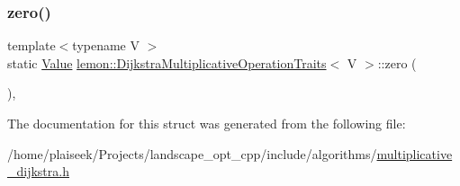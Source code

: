 \mbox{\label{structlemon_1_1_dijkstra_multiplicative_operation_traits_a42a0a16398e1548efd8ffb3616b13866}} 
\subsubsection{\texorpdfstring{zero()}{zero()}}
{\footnotesize\ttfamily template$<$typename V $>$ \\
static \hyperlink{structlemon_1_1_dijkstra_multiplicative_operation_traits_a8832632b11125d59eedb238160bc1554}{Value} \hyperlink{structlemon_1_1_dijkstra_multiplicative_operation_traits}{lemon\+::\+Dijkstra\+Multiplicative\+Operation\+Traits}$<$ V $>$\+::zero (\begin{DoxyParamCaption}{ }\end{DoxyParamCaption})\hspace{0.3cm}{\ttfamily [inline]}, {\ttfamily [static]}}



The documentation for this struct was generated from the following file\+:\begin{DoxyCompactItemize}
\item 
/home/plaiseek/\+Projects/landscape\+\_\+opt\+\_\+cpp/include/algorithms/\hyperlink{multiplicative__dijkstra_8h}{multiplicative\+\_\+dijkstra.\+h}\end{DoxyCompactItemize}
